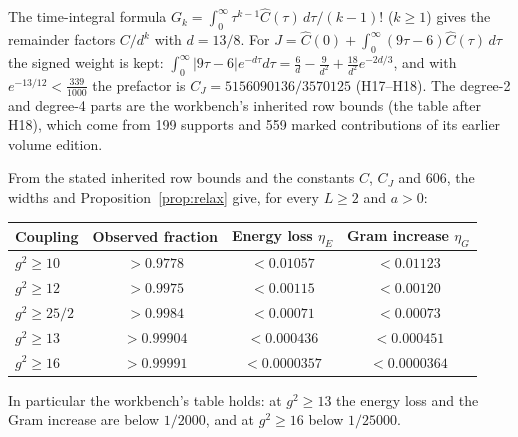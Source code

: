  The time-integral formula $G_k=\int_0^\infty\tau^{k-1}\widehat C(\tau)\,d\tau/(k-1)!$ ($k\ge1$) gives the remainder factors $C/d^k$ with $d=13/8$. For $J=\widehat C(0)+\int_0^\infty(9\tau-6)\widehat C(\tau)\,d\tau$ the signed weight is kept: $\int_0^\infty|9\tau-6|e^{-d\tau}d\tau=\frac6d-\frac9{d^2}+\frac{18}{d^2}e^{-2d/3}$, and with $e^{-13/12}<\frac{339}{1000}$ the prefactor is $C_J=5156090136/3570125$ (H17--H18). The degree-2 and degree-4 parts are the workbench's inherited row bounds (the table after H18), which come from 199 supports and 559 marked contributions of its earlier volume edition.

\begin{proposition}\label{prop:bench}
From the stated inherited row bounds and the constants $C$, $C_J$ and $606$, the widths and Proposition~\ref{prop:relax} give, for every $L\ge2$ and $a>0$:

\begin{center}\small
\begin{tabular}{@{}lccc@{}}
\toprule
Coupling & Observed fraction & Energy loss $\eta_E$ & Gram increase $\eta_G$\\
\midrule
$g^2\ge10$ & $>0.9778$ & $<0.01057$ & $<0.01123$\\
$g^2\ge12$ & $>0.9975$ & $<0.00115$ & $<0.00120$\\
$g^2\ge25/2$ & $>0.9984$ & $<0.00071$ & $<0.00073$\\
$g^2\ge13$ & $>0.99904$ & $<0.000436$ & $<0.000451$\\
$g^2\ge16$ & $>0.99991$ & $<0.0000357$ & $<0.0000364$\\
\bottomrule
\end{tabular}
\end{center}
In particular the workbench's table holds: at $g^2\ge13$ the energy loss and the Gram increase are below $1/2000$, and at $g^2\ge16$ below $1/25000$.
\end{proposition}

